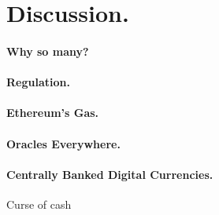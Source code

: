 
\section{Discussion.} 

\paragraph{Why so many?}


\paragraph{Regulation.}

\paragraph{Ethereum's Gas.}

\paragraph{Oracles Everywhere.} 

\paragraph{Centrally Banked Digital Currencies.} Curse of cash

